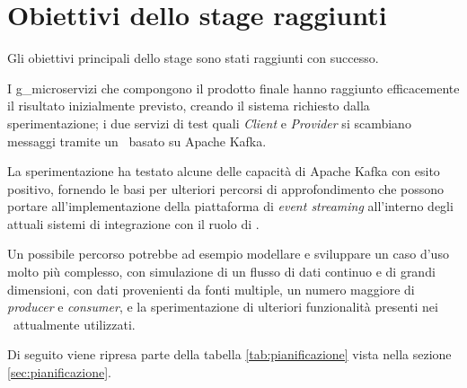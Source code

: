 \section{Obiettivi dello stage raggiunti}

Gli obiettivi principali dello stage sono stati raggiunti con successo.

I \gls{g_microservizi} che compongono il prodotto finale hanno raggiunto efficacemente il risultato inizialmente previsto, creando il sistema richiesto dalla sperimentazione; i due servizi di test quali  \textit{Client} e  \textit{Provider} si scambiano messaggi tramite un \middleware\ basato su Apache Kafka.

La sperimentazione ha testato alcune delle capacità di Apache Kafka con esito positivo, fornendo le basi per ulteriori percorsi di approfondimento che possono portare all'implementazione della piattaforma di \textit{event streaming} all'interno degli attuali sistemi di integrazione con il ruolo di \middleware.

Un possibile percorso potrebbe ad esempio modellare e sviluppare un caso d'uso molto più complesso, con simulazione di un flusso di dati continuo e di grandi dimensioni, con dati provenienti da fonti multiple, un numero maggiore di \textit{producer} e \textit{consumer}, e la sperimentazione di ulteriori funzionalità presenti nei \middleware\ attualmente utilizzati.

\noindent
Di seguito viene ripresa parte della tabella \ref{tab:pianificazione} vista nella sezione \ref{sec:pianificazione}.

